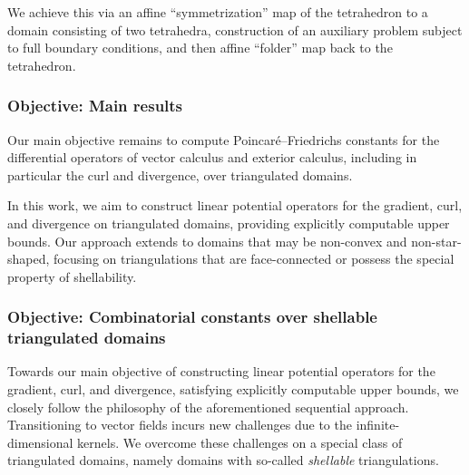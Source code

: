 We achieve this via an affine ``symmetrization'' map of the tetrahedron to a domain consisting of two tetrahedra, 
construction of an auxiliary problem subject to full boundary conditions, 
and then affine ``folder'' map back to the tetrahedron.











\subsubsection{Objective: Main results}


Our main objective remains to compute Poincar\'e--Friedrichs constants for the differential operators of vector calculus and exterior calculus, including in particular the curl and divergence, over triangulated domains. 

In this work, we aim to construct linear potential operators for the gradient, curl, and divergence on triangulated domains, 
providing explicitly computable upper bounds. Our approach extends to domains that may be non-convex and non-star-shaped, 
focusing on triangulations that are face-connected or possess the special property of shellability.



\subsubsection{Objective: Combinatorial constants over shellable triangulated domains}

Towards our main objective of constructing linear potential operators for the gradient, curl, and divergence, satisfying explicitly computable upper bounds, we closely follow the philosophy of the aforementioned sequential approach. Transitioning to vector fields incurs new challenges due to the infinite-dimensional kernels. We overcome these challenges on a special class of triangulated domains, namely domains with so-called \emph{shellable} triangulations. 

